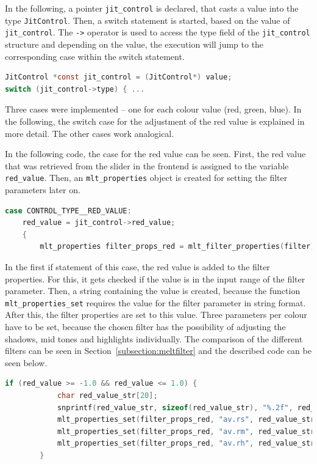 \documentclass[../MasterThesis.tex]{subfiles}
\begin{document}
In the following, a pointer \texttt{jit\_control} is declared, that casts a value into the type \texttt{JitControl}.
Then, a switch statement is started, based on the value of \texttt{jit\_control}.
The \texttt{->} operator is used to access the type field of the \texttt{jit\_control} structure and depending on the value, the execution will jump to the corresponding case within the switch statement.

\begin{lstlisting}[language=c, numbers=none, columns=fullflexible]		
JitControl *const jit_control = (JitControl*) value;
switch (jit_control->type) { ...
\end{lstlisting}

Three cases were implemented -- one for each colour value (red, green, blue). In the following, the switch case for the adjustment of the red value is explained in more detail. The other cases work analogical.

In the following code, the case for the red value can be seen. First, the red value that was retrieved from the slider in the frontend is assigned to the variable \texttt{red\_value}. Then, an \texttt{mlt\_properties} object is created for setting the filter parameters later on. 

\begin{lstlisting}[language=c, numbers=none, columns=fullflexible]			
case CONTROL_TYPE__RED_VALUE:
	red_value = jit_control->red_value;
	{
		mlt_properties filter_props_red = mlt_filter_properties(filter);
\end{lstlisting}

In the first if statement of this case, the red value is added to the filter properties. For this, it gets checked if the value is in the input range of the filter parameter. Then, a string containing the value is created, because the function \texttt{mlt\_properties\_set} requires the value for the filter parameter in string format. After this, the filter properties are set to this value. Three parameters per colour have to be set, because the chosen filter has the possibility of adjusting the shadows, mid tones and highlights individually. 
The comparison of the different filters can be seen in Section~\ref{subsection:meltfilter} and the described code can be seen below.


\begin{lstlisting}[language=c, numbers=none, columns=fullflexible]
		if (red_value >= -1.0 && red_value <= 1.0) {
			char red_value_str[20]; 
			snprintf(red_value_str, sizeof(red_value_str), "%.2f", red_value);
			mlt_properties_set(filter_props_red, "av.rs", red_value_str);
			mlt_properties_set(filter_props_red, "av.rm", red_value_str);
			mlt_properties_set(filter_props_red, "av.rh", red_value_str);
		}	
\end{lstlisting}
\end{document}

